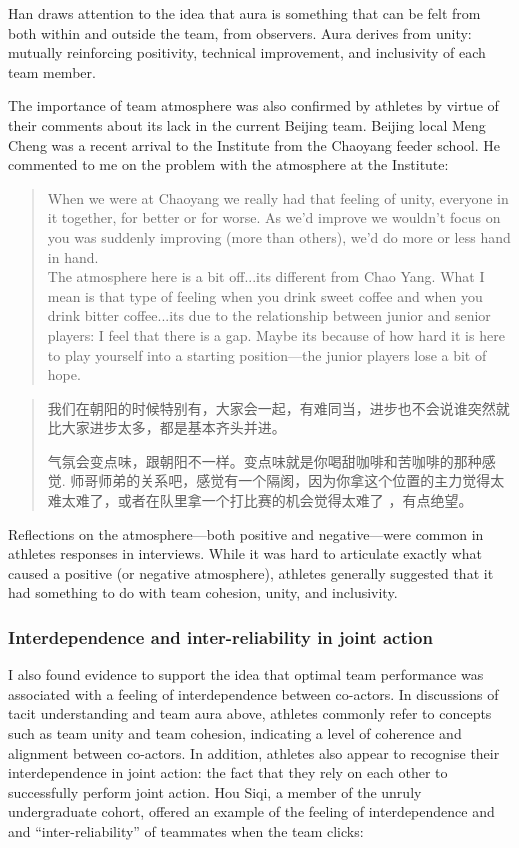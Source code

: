 \begin{CJK}{UTF8}{gbsn}
Han draws attention to the idea that aura is something that can be felt from both within and outside the team, from observers. Aura derives from unity: mutually reinforcing positivity, technical improvement, and inclusivity of each team member.

The importance of team atmosphere was also confirmed by athletes by virtue of their comments about its lack in the current Beijing team. Beijing local  Meng Cheng was a recent arrival to the Institute from the Chaoyang feeder school.  He commented to me on the problem with the atmosphere at the Institute:

    \begin{quote}
      When we were at Chaoyang we really had that feeling of unity, everyone in it together, for better or for worse.  As we'd improve we wouldn't focus on you was suddenly improving (more than others), we'd do more or less hand in hand.
    \\
      The atmosphere here is a bit off...its different from Chao Yang.  What I mean is that type of feeling when you drink sweet coffee and when you drink bitter coffee...its due to the relationship between junior and senior players: I feel that there is a gap.  Maybe its because of how hard it is here to play yourself into a starting position---the junior players lose a bit of hope.
    \end{quote}

    \begin{quote}
      我们在朝阳的时候特别有，大家会一起，有难同当，进步也不会说谁突然就比大家进步太多，都是基本齐头并进。

      气氛会变点味，跟朝阳不一样。变点味就是你喝甜咖啡和苦咖啡的那种感觉. 师哥师弟的关系吧，感觉有一个隔阂，因为你拿这个位置的主力觉得太难太难了，或者在队里拿一个打比赛的机会觉得太难了 ，有点绝望。
    \end{quote}

Reflections on the atmosphere---both positive and negative---were common in athletes responses in interviews.  While it was hard to articulate exactly what caused a positive (or negative atmosphere), athletes generally suggested that it had something to do with team cohesion, unity, and inclusivity.

\subsubsection{Interdependence and inter-reliability in joint action}

I also found evidence to support the idea that optimal team performance was associated with a feeling of interdependence between co-actors.  In discussions of tacit understanding and team aura above, athletes commonly refer to concepts such as team unity and team cohesion, indicating a level of coherence and alignment between co-actors.  In addition, athletes also appear to recognise their interdependence in joint action: the fact that they rely on each other to successfully perform joint action.  Hou Siqi, a member of the unruly undergraduate cohort, offered an example of the feeling of interdependence and and ``inter-reliability'' of teammates when the team clicks:


\end{CJK}
